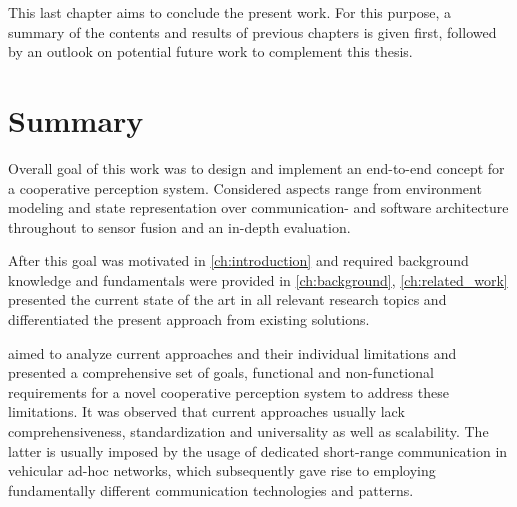 This last chapter aims to conclude the present work. For this purpose, a summary of the contents and results of previous chapters is given first, followed by an outlook on potential future work to complement this thesis.

\section{Summary}
\label{sec:conclusion:summary}
Overall goal of this work was to design and implement an end-to-end concept for a cooperative perception system. Considered aspects range from environment modeling and state representation over communication- and software architecture throughout to sensor fusion and an in-depth evaluation. 
\par
\bigskip

After this goal was motivated in \cref{ch:introduction} and required background knowledge and fundamentals were provided in \cref{ch:background}, \cref{ch:related_work} presented the current state of the art in all relevant research topics and differentiated the present approach from existing solutions. 
\par
\bigskip

 aimed to analyze current approaches and their individual limitations and presented a comprehensive set of goals, functional and non-functional requirements for a novel cooperative perception system to address these limitations. It was observed that current approaches usually lack comprehensiveness, standardization and universality as well as scalability. The latter is usually imposed by the usage of dedicated short-range communication in vehicular ad-hoc networks, which subsequently gave rise to employing fundamentally different communication technologies and patterns.
\par
\bigskip


